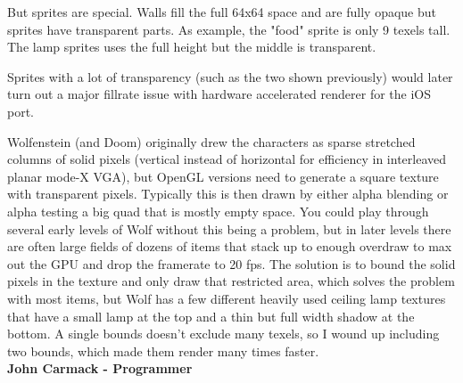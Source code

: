But sprites are special. Walls fill the full 64x64 space and are fully opaque but sprites have transparent parts. As example, the "food" sprite is only 9 texels tall. The lamp sprites uses the full height but the middle is transparent.\\


  \begin{minipage}{.5\textwidth} 
   \end{minipage}
  \begin{minipage}{.5\textwidth} 
   \end{minipage}

\par

 Sprites with a lot of transparency (such as the two shown previously) would later turn out a major fillrate issue with hardware accelerated renderer for the iOS port.\\
\par
\begin{fancyquotes}
Wolfenstein (and Doom) originally drew the characters as sparse stretched columns of solid pixels (vertical instead of horizontal for efficiency in interleaved planar mode-X VGA), but OpenGL versions need to generate a square texture with transparent pixels.  Typically this is then drawn by either alpha blending or alpha testing a big quad that is mostly empty space.  You could play through several early levels of Wolf without this being a problem, but in later levels there are often large fields of dozens of items that stack up to enough overdraw to max out the GPU and drop the framerate to 20 fps.  The solution is to bound the solid pixels in the texture and only draw that restricted area, which solves the problem with most items, but Wolf has a few different heavily used ceiling lamp textures that have a small lamp at the top and a thin but full width shadow at the bottom.  A single bounds doesn't exclude many texels, so I wound up including two bounds, which made them render many times faster. 
\bigskip \\
\textbf{John Carmack - Programmer}
 \end{fancyquotes}

\par












